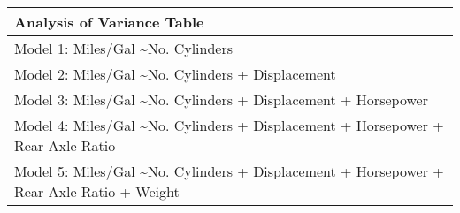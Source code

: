 \begin{tabular}{l}
  \hline
Analysis of Variance Table \\ 
  \hline
Model 1: Miles/Gal \textasciitilde No. Cylinders \\ 
  Model 2: Miles/Gal \textasciitilde No. Cylinders + Displacement \\ 
  Model 3: Miles/Gal \textasciitilde No. Cylinders + Displacement + Horsepower \\ 
  Model 4: Miles/Gal \textasciitilde No. Cylinders + Displacement + Horsepower + Rear Axle Ratio \\ 
  Model 5: Miles/Gal \textasciitilde No. Cylinders + Displacement + Horsepower + Rear Axle Ratio + Weight \\ 
   \hline
\end{tabular}
